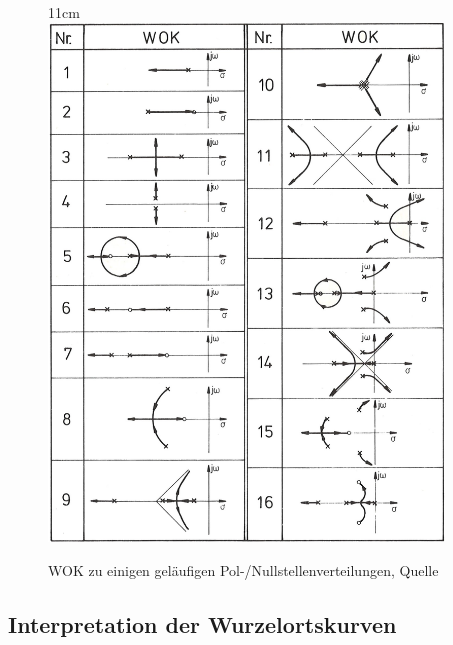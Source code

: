 	\begin{figure}[h!]{11cm}
		\includegraphics[width=10.5cm]{./images/BilderWOK.png}
		\caption{WOK zu einigen geläufigen Pol-/Nullstellenverteilungen, Quelle}
	\end{figure}

\clearpage

\subsection{Interpretation der Wurzelortskurven}

